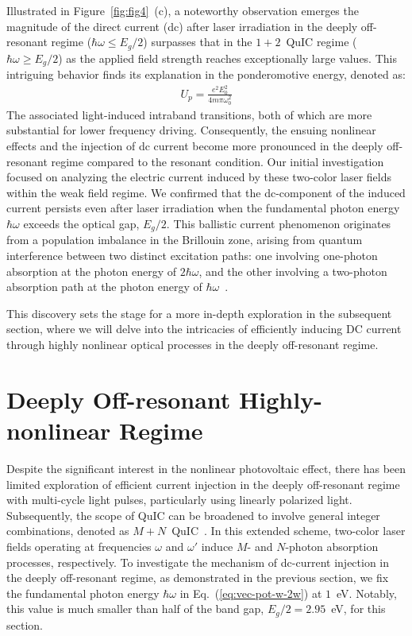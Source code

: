  Illustrated in Figure~\ref{fig:fig4}~(c), a noteworthy observation emerges the magnitude of the direct current (dc) after laser irradiation in the deeply off-resonant regime ($\hbar \omega \le E_g/2$) surpasses that in the $1+2$~\gls{QuIC} regime ($\hbar \omega \ge E_g/2$) as the applied field strength reaches exceptionally large values. This intriguing behavior finds its explanation in the ponderomotive energy, denoted as:
 \begin{align}
 U_p=\frac{e^2E^2_0}{4m\pi \omega_0^2}    
 \end{align}
 The associated light-induced intraband transitions, both of which are more substantial for lower frequency driving\cite{PhysRevB.98.035202}. Consequently, the ensuing nonlinear effects and the injection of dc current become more pronounced in the deeply off-resonant regime compared to the resonant condition. 
Our initial investigation focused on analyzing the electric current induced by these two-color laser fields within the weak field regime. We confirmed that the dc-component of the induced current persists even after laser irradiation when the fundamental photon energy $\hbar \omega$ exceeds the optical gap, $E_g/2$. This ballistic current phenomenon originates from a population imbalance in the Brillouin zone, arising from quantum interference between two distinct excitation paths: one involving one-photon absorption at the photon energy of $2\hbar \omega$, and the other involving a two-photon absorption path at the photon energy of $\hbar \omega$~\cite{PhysRevLett.74.3596,PhysRevLett.76.1703,PhysRevLett.78.306}.


 This discovery sets the stage for a more in-depth exploration in the subsequent section, where we will delve into the intricacies of efficiently inducing DC current through highly nonlinear optical processes in the deeply off-resonant regime.


\section{Deeply Off-resonant Highly-nonlinear Regime \label{sec:nonperturbative}}

Despite the significant interest in the nonlinear photovoltaic effect, there has been limited exploration of efficient current injection in the deeply off-resonant regime with multi-cycle light pulses, particularly using linearly polarized light. Subsequently, the scope of \gls{QuIC} can be broadened to involve general integer combinations, denoted as $M+N$~\gls{QuIC}~\cite{PhysRevB.100.075202,PhysRevLett.123.067402}. In this extended scheme, two-color laser fields operating at frequencies $\omega$ and $\omega'$ induce $M$- and $N$-photon absorption processes, respectively.
To investigate the mechanism of dc-current injection in the deeply off-resonant regime, as demonstrated in the previous section, we fix the fundamental photon energy $\hbar \omega$ in Eq.~(\ref{eq:vec-pot-w-2w}) at $1$~eV. Notably, this value is much smaller than half of the band gap, $E_g/2=2.95$~eV, for this section.

